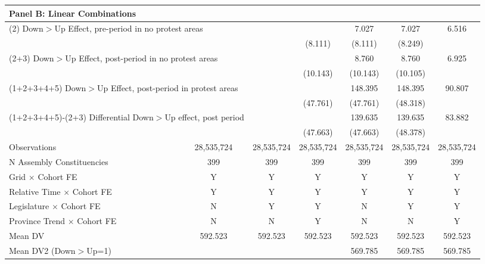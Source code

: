 {\begin{tabular}{l*{6}{c}}
\hline
\multicolumn{7}{l}{\textbf{Panel B: Linear Combinations}} \\ \hline
\multicolumn{2}{l}{(2) Down$>$Up Effect, pre-period in no protest areas}&            &            &       7.027&       7.027&       6.516\\
            &            &            &     (8.111)&     (8.111)&     (8.249)\\
\multicolumn{2}{l}{(2+3) Down$>$Up Effect, post-period in no protest areas}&            &            &       8.760&       8.760&       6.925\\
            &            &            &    (10.143)&    (10.143)&    (10.105)\\
\multicolumn{2}{l}{(1+2+3+4+5) Down$>$Up Effect, post-period in protest areas}&            &            &148.395\sym{***}&148.395\sym{***}&90.807\sym{*}\\
            &            &            &    (47.761)&    (47.761)&    (48.318)\\
\multicolumn{2}{l}{(1+2+3+4+5)-(2+3) Differential Down$>$Up effect, post period}&            &            &139.635\sym{***}&139.635\sym{***}&83.882\sym{*}\\
            &            &            &    (47.663)&    (47.663)&    (48.378)\\



\hline
Observations&  28,535,724&  28,535,724&  28,535,724&  28,535,724&  28,535,724&  28,535,724\\
N Assembly Constituencies&         399&         399&         399&         399&         399&         399\\
Grid $\times$ Cohort FE&           Y&           Y&           Y&           Y&           Y&           Y\\
Relative Time $\times$ Cohort FE&           Y&           Y&           Y&           Y&           Y&           Y\\
Legislature $\times$ Cohort FE&           N&           Y&           Y&           N&           Y&           Y\\
Province Trend $\times$ Cohort FE&           N&           N&           Y&           N&           N&           Y\\
Mean DV     &     592.523&     592.523&     592.523&     592.523&     592.523&     592.523\\
Mean DV2 (Down$>$Up=1)&            &            &            &     569.785&     569.785&     569.785\\
\hline
\end{tabular}
}
